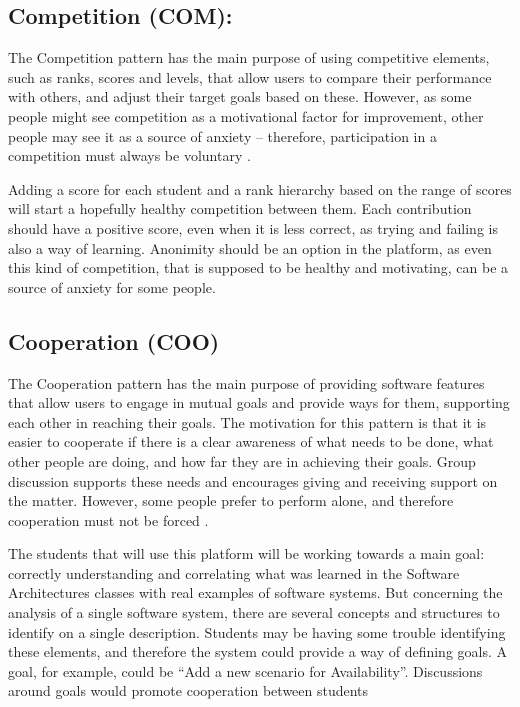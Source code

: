 \documentclass{llncs}
\begin{document}
\subsection{Competition (COM):}
The Competition pattern has the main purpose of using competitive elements, such as ranks, scores and levels, that allow users to compare their performance with others, and adjust their target goals based on these. However, as some people might see competition as a motivational factor for improvement, other people may see it as a source of anxiety – therefore, participation in a competition must always be voluntary \cite{oduor2014persuasive}.

Adding a score for each student and a rank hierarchy based on the range of scores will start a hopefully healthy competition between them. Each contribution should have a positive score, even when it is less correct, as trying and failing is also a way of learning. Anonimity should be an option in the platform, as even this kind of competition, that is supposed to be healthy and motivating, can be a source of anxiety for some people.

\subsection{Cooperation (COO)}
The Cooperation pattern has the main purpose of providing software features that allow users to engage in mutual goals and provide ways for them, supporting each other in reaching their goals. The motivation for this pattern is that it is easier to cooperate if there is a clear awareness of what needs to be done, what other people are doing, and how far they are in achieving their goals. Group discussion supports these needs and encourages giving and receiving support on the matter. However, some people prefer to perform alone, and therefore cooperation must not be forced \cite{oduor2014persuasive}. 

The students that will use this platform will be working towards a main goal: correctly understanding and correlating what was learned in the Software Architectures classes with real examples of software systems. But concerning the analysis of a single software system, there are several concepts and structures to identify on a single description. Students may be having some trouble identifying these elements, and therefore the system could provide a way of defining goals. A goal, for example, could be ``Add a new scenario for Availability''. Discussions around goals would promote cooperation between students
\end{document}
